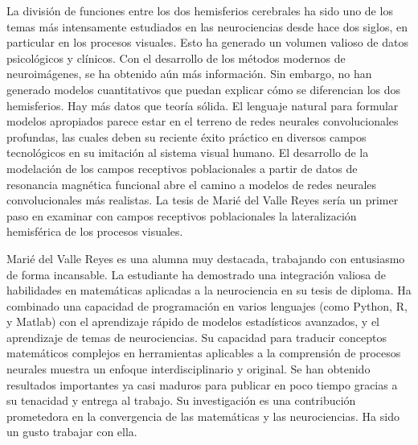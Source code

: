 \begin{opinion}
    La división de funciones entre los dos hemisferios cerebrales ha sido uno de los temas más intensamente estudiados en las neurociencias desde hace dos siglos, en particular en los procesos visuales. Esto ha generado un volumen valioso de datos psicológicos y clínicos. Con el desarrollo de los métodos modernos de neuroimágenes, se ha obtenido aún más información. Sin embargo, no han generado modelos cuantitativos que puedan explicar cómo se diferencian los dos hemisferios. Hay más datos que teoría sólida. El lenguaje natural para formular modelos apropiados parece estar en el terreno de redes neurales convolucionales profundas, las cuales deben su reciente éxito práctico en diversos campos tecnológicos en su imitación al sistema visual humano. El desarrollo de la modelación de los campos receptivos poblacionales a partir de datos de resonancia magnética funcional abre el camino a modelos de redes neurales convolucionales m\'as realistas.  La tesis de Mari\'e del Valle Reyes sería un primer paso en examinar con campos receptivos poblacionales la lateralización hemisférica de los procesos visuales.
    
    Mari\'e del Valle Reyes es una alumna muy destacada, trabajando con entusiasmo de forma incansable. La estudiante ha demostrado una integración valiosa de habilidades en matemáticas aplicadas a la neurociencia en su tesis de diploma. Ha combinado una capacidad de programación en varios lenguajes (como Python, R, y Matlab) con el aprendizaje rápido de modelos estadísticos avanzados, y el aprendizaje de temas de neurociencias. Su capacidad para traducir conceptos matemáticos complejos en herramientas aplicables a la comprensión de procesos neurales muestra un enfoque interdisciplinario y original. Se han obtenido resultados importantes ya casi maduros para publicar en poco tiempo gracias a su tenacidad y entrega al trabajo. Su investigación es una contribución prometedora en la convergencia de las matemáticas y las neurociencias. Ha sido un gusto trabajar con ella.
\end{opinion}